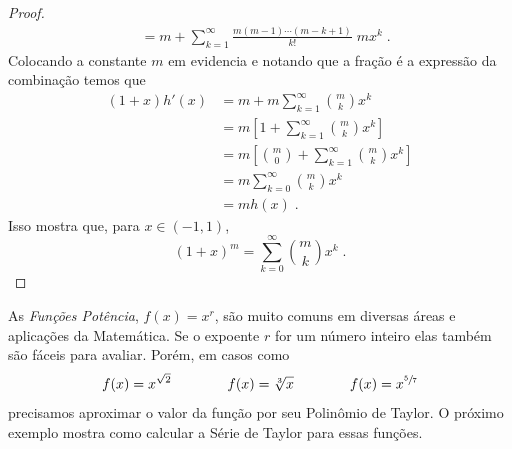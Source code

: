 \begin{proof}
\begin{align*}
    & = m+\sum_{k=1}^\infty \frac{m(m-1)\cdots(m-k+1)}{k!} \;m x^{k}          \;.
  \end{align*}
  Colocando a constante $m$ em evidencia e notando que a
  fração é a expressão da combinação temos que
  \begin{align*}
    (1+x) h'(x)
      & = m + m \sum_{k=1}^\infty \binom{m}{k} x^{k}                             \\[3mm]
      & = m \left[ 1            + \sum_{k=1}^\infty \binom{m}{k} x^{k} \right]   \\[3mm]
      & = m \left[ \binom{m}{0} + \sum_{k=1}^\infty \binom{m}{k} x^{k} \right]   \\[3mm]
      & = m \sum_{k=0}^\infty \binom{m}{k} x^{k}                                 \\[3mm]
      & = m h(x)          \;.
  \end{align*}
  Isso mostra que, para $x\in(-1, 1)$,
  \[
    (1+x)^m = \sum_{k=0}^\infty \binom{m}{k} x^k          \;.
  \]
\end{proof}

As \emph{Funções Potência},
\(
  f(x) = x^r
\),
são muito comuns em diversas áreas e aplicações da Matemática.
Se o expoente $r$ for um número inteiro elas também são fáceis para avaliar.
Porém, em casos como
\[
f(x) = x^{\sqrt{2}}     \qquad\qquad
f(x) = \sqrt[3]{x}      \qquad\qquad
f(x) = x^{\sfrac{5}{7}}
\]
precisamos aproximar o valor da função por seu Polinômio de Taylor.
O próximo exemplo mostra como calcular a Série de Taylor para essas
funções.

